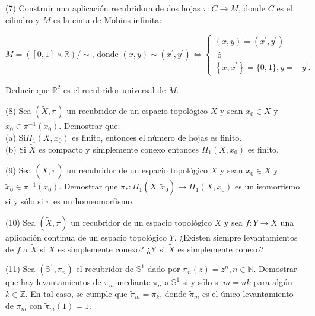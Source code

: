 \documentclass[
  a4paper,
  spanish,
  12pt,
]{scrartcl}
\begin{document}
\begin{ejer}
(7) Construir una aplicación recubridora de dos hojas $\pi: C \rightarrow M$, donde $C$ es el cilindro y $M$ es la cinta de Möbius infinita:

$$
M=([0,1] \times \mathbb{R}) / \sim \text {, donde }(x, y) \sim\left(x^{\prime}, y^{\prime}\right) \Leftrightarrow\left\{\begin{array}{l}
(x, y)=\left(x^{\prime}, y^{\prime}\right) \\
\text { ó } \\
\left\{x, x^{\prime}\right\}=\{0,1\}, y=-y^{\prime} .
\end{array}\right.
$$


Deducir que $\mathbb{R}^{2}$ es el recubridor universal de $M$.\\
\end{ejer}

\begin{ejer}
(8) Sea $(\widetilde{X}, \pi)$ un recubridor de un espacio topológico $X$ y sean $x_{0} \in X$ y $\widetilde{x}_{0} \in \pi^{-1}\left(x_{0}\right)$. Demostrar que:\\
(a) $\mathrm{Si} \Pi_{1}\left(X, x_{0}\right)$ es finito, entonces el número de hojas es finito.\\
(b) Si $\widetilde{X}$ es compacto y simplemente conexo entonces $\Pi_{1}\left(X, x_{0}\right)$ es finito.\\
\end{ejer}

\begin{ejer}
(9) Sea $(\widetilde{X}, \pi)$ un recubridor de un espacio topológico $X$ y sean $x_{0} \in X$ y $\widetilde{x}_{0} \in \pi^{-1}\left(x_{0}\right)$. Demostrar que $\pi_{*}: \Pi_{1}\left(\widetilde{X}, \widetilde{x}_{0}\right) \rightarrow \Pi_{1}\left(X, x_{0}\right)$ es un isomorfismo si y sólo si $\pi$ es un homeomorfismo.\\
\end{ejer}

\begin{ejer}
(10) Sea $(\widetilde{X}, \pi)$ un recubridor de un espacio topológico $X$ y sea $f: Y \rightarrow X$ una aplicación continua de un espacio topológico $Y$. ¿Existen siempre levantamientos de $f$ a $\widetilde{X}$ si $X$ es simplemente conexo? ¿Y si $\widetilde{X}$ es simplemente conexo?\\
\end{ejer}

\begin{ejer}
(11) Sea $\left(\mathbb{S}^{1}, \pi_{n}\right)$ el recubridor de $\mathbb{S}^{1}$ dado por $\pi_{n}(z)=z^{n}, n \in \mathbb{N}$. Demostrar que hay levantamientos de $\pi_{m}$ mediante $\pi_{n}$ a $\mathbb{S}^{1}$ si y sólo si $m=n k$ para algún $k \in \mathbb{Z}$. En tal caso, se cumple que $\widetilde{\pi}_{m}=\pi_{k}$, donde $\widetilde{\pi}_{m}$ es el único levantamiento de $\pi_{m}$ con $\widetilde{\pi}_{m}(1)=1$.\\
\end{ejer}
\end{document}
